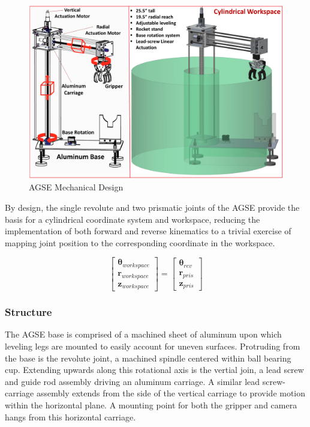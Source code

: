 \begin{figure}[h]
	\centering
        \includegraphics[width=\textwidth]{./Figures/AGSE_Mechanical_Design_Figure.png}
	\caption{AGSE Mechanical Design}
	\label{fig:Render}
\end{figure}

By design, the single revolute and two prismatic joints of the AGSE
provide the basis for a cylindrical coordinate system and workspace,
reducing the implementation of both forward and reverse kinematics to
a trivial exercise of mapping joint position to the corresponding
coordinate in the workspace.

$$
\begin{bmatrix}
	\boldsymbol{\theta}_{workspace}\\\mathbf{r}_{workspace}\\\mathbf{z}_{workspace}
\end{bmatrix}=
\begin{bmatrix}
	\boldsymbol{\theta}_{rev}\\\mathbf{r}_{pris}\\\mathbf{z}_{pris}
\end{bmatrix}
$$

\subsubsection{Structure}

The AGSE base is comprised of a machined sheet of aluminum upon which
leveling legs are mounted to easily account for uneven surfaces.
Protruding from the base is the revolute joint, a machined spindle
centered within ball bearing cup. Extending upwards along this
rotational axis is the vertial join, a lead screw and guide rod
assembly driving an aluminum carriage. A similar lead screw-carriage
assembly extends from the side of the vertical carriage to provide
motion within the horizontal plane. A mounting point for both the
gripper and camera hangs from this horizontal carriage.

